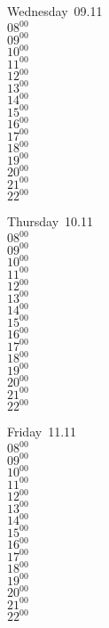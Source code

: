\documentclass[11pt,a4paper]{book}\usepackage[]{graphicx}\usepackage[]{color}
\begin{document}
\begin{weekdaybox}
  Wednesday~09.11\\
  { 
  \vfill
  $08^{00}$\\
$09^{00}$\\
$10^{00}$\\
$11^{00}$\\
$12^{00}$\\
$13^{00}$\\
$14^{00}$\\
$15^{00}$\\
$16^{00}$\\
$17^{00}$\\
$18^{00}$\\
$19^{00}$\\
$20^{00}$\\
$21^{00}$\\
$22^{00}$\\
  }
\end{weekdaybox}
\clearpage
\begin{headerbox}
\end{headerbox}
\begin{weekdaybox}
  Thursday~10.11\\
  { 
  \vfill
  $08^{00}$\\
$09^{00}$\\
$10^{00}$\\
$11^{00}$\\
$12^{00}$\\
$13^{00}$\\
$14^{00}$\\
$15^{00}$\\
$16^{00}$\\
$17^{00}$\\
$18^{00}$\\
$19^{00}$\\
$20^{00}$\\
$21^{00}$\\
$22^{00}$\\
  }
\end{weekdaybox} 
\begin{weekdaybox}
  Friday~11.11\\
  { 
  \vfill
  $08^{00}$\\
$09^{00}$\\
$10^{00}$\\
$11^{00}$\\
$12^{00}$\\
$13^{00}$\\
$14^{00}$\\
$15^{00}$\\
$16^{00}$\\
$17^{00}$\\
$18^{00}$\\
$19^{00}$\\
$20^{00}$\\
$21^{00}$\\
$22^{00}$\\
  }
\end{weekdaybox}
\end{document}
